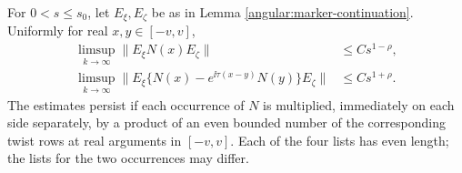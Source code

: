 \begin{lemma}\label{angular:low-band}
For $0<s\le s_0$, let $E_\xi,E_\zeta$ be as in Lemma
\ref{angular:marker-continuation}.  Uniformly for real $x,y\in[-v,v]$,
\begin{align}
 \limsup_{k\to\infty}\|E_\xi N(x)E_\zeta\|
 &\le Cs^{1-\rho},\label{angular:low-band-size}\\
 \limsup_{k\to\infty}
 \|E_\xi\{N(x)-e^{\ii\tau(x-y)}N(y)\}E_\zeta\|
 &\le Cs^{1+\rho}.\label{angular:low-band-difference}
\end{align}
The estimates persist if each occurrence of $N$ is multiplied,
immediately on each side separately, by a product of an even bounded
number of the corresponding twist rows at real arguments in $[-v,v]$.
Each of the four lists has even length; the lists for the two
occurrences may differ.
\end{lemma}


